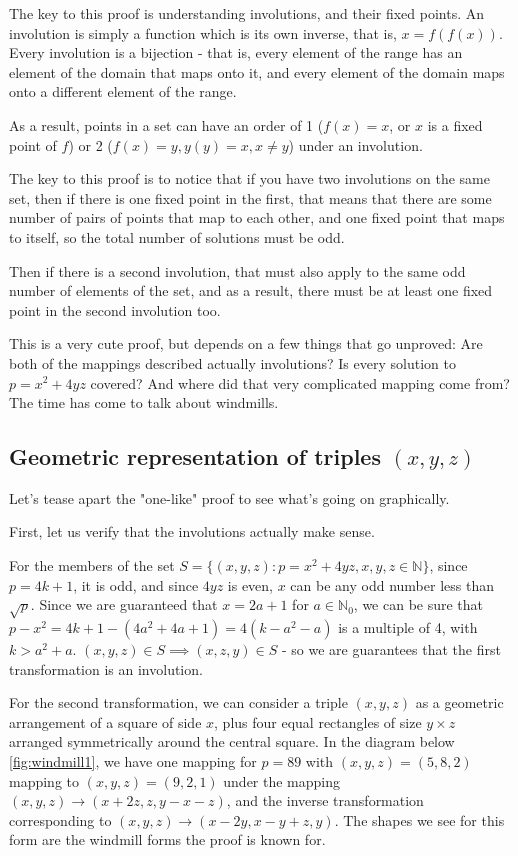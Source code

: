 \documentclass{article}
\begin{document}
The key to this proof is understanding involutions, and their fixed points. An involution
is simply a function which is its own inverse, that is, $x = f(f(x))$. Every involution is
a bijection - that is, every element of the range has an element of the domain that maps
onto it, and every element of the domain maps onto a different element of the range.

As a result, points in a set can have an order of 1 ($f(x)=x$, or $x$ is a fixed point
of $f$) or 2 ($f(x)=y, y(y)=x, x\neq y$) under an involution.

The key to this proof is to notice that if you have two involutions on the same set,
then if there is one fixed point in the first, that means that there are some number of
pairs of points that map to each other, and one fixed point that maps to itself, so the
total number of solutions must be odd.

Then if there is a second involution, that must also apply to the same odd number of
elements of the set, and as a result, there must be at least one fixed point in the
second involution too.

This is a very cute proof, but depends on a few things that go unproved: Are both of
the mappings described actually involutions? Is every solution to $p=x^2+4yz$ covered?
And where did that very complicated mapping come from? The time has come to talk about
windmills.

\subsection{Geometric representation of triples $(x,y,z)$}

Let's tease apart the "one-like" proof to see what's going on graphically.

First, let us verify that the involutions actually make sense.

For the members of the set $S=\{(x,y,z):p=x^2+4yz, x, y, z \in \mathbb{N}\}$, since
$p = 4k+1$, it is odd, and since $4yz$ is even, $x$ can be any odd number less than
$\sqrt{p}$. Since we are guaranteed that $x=2a+1$ for $a\in \mathbb{N}_0$, we can be
sure that $p-x^2 = 4k+1 -(4a^2+4a+1) = 4(k-a^2-a)$ is a multiple of 4, with $k>a^2+a$.
$(x,y,z) \in S \implies (x,z,y) \in S$ - so we are guarantees that the first
transformation is an involution.

For the second transformation, we can consider a triple $(x,y,z)$ as a geometric
arrangement of a square of side $x$, plus four equal rectangles of size $y\times z$
arranged symmetrically around the central square. In the diagram below \ref{fig:windmill1},
we have one mapping for $p=89$ with $(x,y,z)=(5,8,2)$ mapping to $(x,y,z)=(9,2,1)$ under the
mapping $(x,y,z) \to (x+2z,z,y-x-z)$, and the inverse transformation corresponding
to $(x,y,z) \to (x-2y,x-y+z,y)$. The shapes we see for this form are the windmill
forms the proof is known for.
\end{document}
